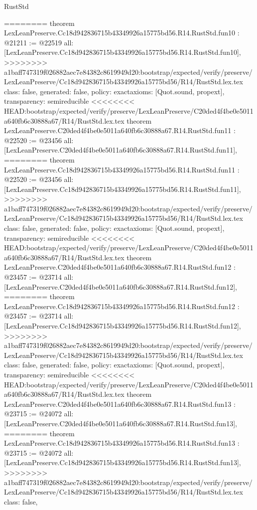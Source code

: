 \begin{lexlean}{RustStd}
\begin{coremodule}
{\begin{coremodule}
{{{{{{{{{{{{{========
theorem LexLeanPreserve.Cc18d942836715b43349926a15775bd56.R14.RustStd.fun10 : @21211 := @22519 {
  all: [LexLeanPreserve.Cc18d942836715b43349926a15775bd56.R14.RustStd.fun10],
>>>>>>>> a1baff747319f026882aec7e84382c8619949d20:bootstrap/expected/verify/preserve/LexLeanPreserve/Cc18d942836715b43349926a15775bd56/R14/RustStd.lex.tex
  class: false,
  generated: false,
  policy: exact{axioms: [Quot.sound, propext]},
  transparency: semireducible
}
<<<<<<<< HEAD:bootstrap/expected/verify/preserve/LexLeanPreserve/C20ded4f4be0e5011a640fb6c30888a67/R14/RustStd.lex.tex
theorem LexLeanPreserve.C20ded4f4be0e5011a640fb6c30888a67.R14.RustStd.fun11 : @22520 := @23456 {
  all: [LexLeanPreserve.C20ded4f4be0e5011a640fb6c30888a67.R14.RustStd.fun11],
========
theorem LexLeanPreserve.Cc18d942836715b43349926a15775bd56.R14.RustStd.fun11 : @22520 := @23456 {
  all: [LexLeanPreserve.Cc18d942836715b43349926a15775bd56.R14.RustStd.fun11],
>>>>>>>> a1baff747319f026882aec7e84382c8619949d20:bootstrap/expected/verify/preserve/LexLeanPreserve/Cc18d942836715b43349926a15775bd56/R14/RustStd.lex.tex
  class: false,
  generated: false,
  policy: exact{axioms: [Quot.sound, propext]},
  transparency: semireducible
}
<<<<<<<< HEAD:bootstrap/expected/verify/preserve/LexLeanPreserve/C20ded4f4be0e5011a640fb6c30888a67/R14/RustStd.lex.tex
theorem LexLeanPreserve.C20ded4f4be0e5011a640fb6c30888a67.R14.RustStd.fun12 : @23457 := @23714 {
  all: [LexLeanPreserve.C20ded4f4be0e5011a640fb6c30888a67.R14.RustStd.fun12],
========
theorem LexLeanPreserve.Cc18d942836715b43349926a15775bd56.R14.RustStd.fun12 : @23457 := @23714 {
  all: [LexLeanPreserve.Cc18d942836715b43349926a15775bd56.R14.RustStd.fun12],
>>>>>>>> a1baff747319f026882aec7e84382c8619949d20:bootstrap/expected/verify/preserve/LexLeanPreserve/Cc18d942836715b43349926a15775bd56/R14/RustStd.lex.tex
  class: false,
  generated: false,
  policy: exact{axioms: [Quot.sound, propext]},
  transparency: semireducible
}
<<<<<<<< HEAD:bootstrap/expected/verify/preserve/LexLeanPreserve/C20ded4f4be0e5011a640fb6c30888a67/R14/RustStd.lex.tex
theorem LexLeanPreserve.C20ded4f4be0e5011a640fb6c30888a67.R14.RustStd.fun13 : @23715 := @24072 {
  all: [LexLeanPreserve.C20ded4f4be0e5011a640fb6c30888a67.R14.RustStd.fun13],
========
theorem LexLeanPreserve.Cc18d942836715b43349926a15775bd56.R14.RustStd.fun13 : @23715 := @24072 {
  all: [LexLeanPreserve.Cc18d942836715b43349926a15775bd56.R14.RustStd.fun13],
>>>>>>>> a1baff747319f026882aec7e84382c8619949d20:bootstrap/expected/verify/preserve/LexLeanPreserve/Cc18d942836715b43349926a15775bd56/R14/RustStd.lex.tex
  class: false,
}}}}}}}}}}}}}}}}}
\end{coremodule}}
\end{coremodule}
\end{lexlean}
